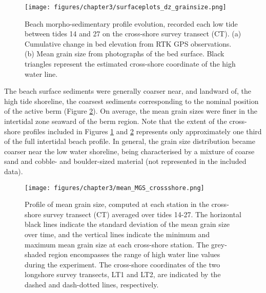 \documentclass[jmse,article,submit,pdftex,moreauthors]{Definitions/mdpi}
\begin{document}
\begin{figure}[tbp] %
	\texttt{[image: figures/chapter3/surfaceplots\_dz\_grainsize.png]}
	\caption[Surface plots of bed level change and mean grain size by tide]{Beach morpho-sedimentary profile evolution, recorded each low tide between tides 14 and 27 on the cross-shore survey transect (CT). (a) Cumulative change in bed elevation from RTK GPS observations. (b) Mean grain size from photographs of the bed surface. Black triangles represent the estimated cross-shore coordinate of the high water line.}
	\label{fig:alltides_profiles}
\end{figure}

The beach surface sediments were generally coarser near, and landward of, the high tide shoreline, the coarsest sediments corresponding to the nominal position of the active berm (Figure \ref{fig:mean_MGS_profile}). On average, the mean grain sizes were finer in the intertidal zone seaward of the berm region. Note that the extent of the cross-shore profiles included in Figures \ref{fig:alltides_profiles} and \ref{fig:mean_MGS_profile} represents only approximately one third of the full intertidal beach profile. In general, the grain size distribution became coarser near the low water shoreline, being characterised by a mixture of coarse sand and cobble- and boulder-sized material (not represented in the included data). 

\begin{figure}[tbp] %
	\begin{center}
		\texttt{[image: figures/chapter3/mean\_MGS\_crossshore.png]}
		\caption[Cross-shore profile of mean grain size]{Profile of mean grain size, computed at each station in the cross-shore survey transect (CT) averaged over tides 14-27. The horizontal black lines indicate the standard deviation of the mean grain size over time, and the vertical lines indicate the minimum and maximum mean grain size at each cross-shore station. The grey-shaded region encompasses the range of high water line values during the experiment. The cross-shore coordinates of the two longshore survey transects, LT1 and LT2, are indicated by the dashed and dash-dotted lines, respectively. \label{fig:mean_MGS_profile}}
	\end{center}
\end{figure}
\end{document}
